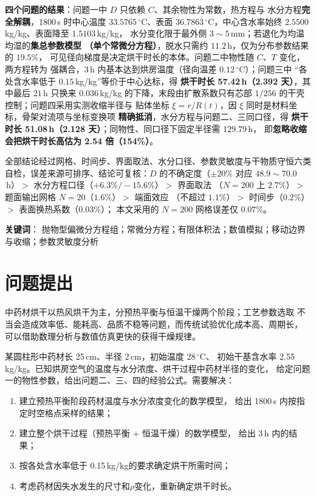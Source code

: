 \documentclass[12pt,a4paper,fontset=none]{ctexart}
\begin{document}
\textbf{四个问题的结果}：问题一中 $D$ 只依赖 $C$、其余物性为常数，热方程与
水分方程\textbf{完全解耦}，1800\,s 时中心温度 $33.5765\,^\circ$C、表面
$36.7863\,^\circ$C，中心含水率始终 $2.5500$\,kg/kg、表面降至 $1.5103$\,kg/kg，
水分变化限于最外侧 $3\sim5$\,mm；若退化为均温均湿的\textbf{集总参数模型
（单个常微分方程）}，脱水只需约 $11.2$\,h，仅为分布参数结果的 $19.5\%$，
可见径向梯度是决定烘干时长的本体。问题二中物性随 $C$、$T$ 变化，两方程转为
强耦合，3\,h 内基本达到烘房温度（径向温差 $0.12\,^\circ$C）；问题三中
“各处含水率低于 $0.15$\,kg/kg”等价于中心达标，得
\textbf{烘干时长 57.42\,h（2.392 天）}，其中最后 $21$\,h 只换来 $0.036$\,kg/kg
的下降，末段由扩散系数只有芯部 $1/256$ 的干壳控制；问题四采用实测收缩半径与
贴体坐标 $\xi=r/R(t)$，因 $\xi$ 同时是材料坐标，骨架对流项与坐标变换项
\textbf{精确抵消}，水分方程与问题二、三同口径，得
\textbf{烘干时长 51.08\,h（2.128 天）}；同物性、同口径下固定半径需 $129.79$\,h，
即\textbf{忽略收缩会把烘干时长高估为 2.54 倍（154\%）}。

全部结论经过网格、时间步、界面取法、水分口径、参数灵敏度与干物质守恒六类
自检，误差来源可排序、结论可复核：$D$ 的不确定度（$\pm20\%$ 对应
$48.9\sim70.0$\,h）$>$ 水分方程口径（$+6.3\%/-15.6\%$）$>$ 界面取法
（$N=200$ 上 $2.7\%$）$>$ 题面输出网格 $N=20$（$1.6\%$）$>$ 端面效应
（不超过 $1.1\%$）$>$ 时间步（$0.2\%$）$>$ 表面换热系数（$0.03\%$）；
本文采用的 $N=200$ 网格误差仅 $0.07\%$。

\vspace{1em}
\noindent\textbf{关键词}：
抛物型偏微分方程组；常微分方程；有限体积法；数值模拟；移动边界与收缩；参数灵敏度分析

\section{问题提出}

中药材烘干以热风烘干为主\cite{ref-pan}，分预热平衡与恒温干燥两个阶段；工艺参数选取
不当会造成效率低、能耗高、品质不稳等问题，而传统试验优化成本高、周期长，
可以借助数理分析与数值仿真更快的获得干燥规律。

某圆柱形中药材长 25\,cm、半径 2\,cm，初始温度 28\,$^\circ$C、
初始干基含水率 2.55\,kg/kg。已知烘房空气的温度与水分浓度、烘干过程中药材半径的变化，
给定问题一的物性参数，给出问题二、三、四的经验公式。需要解决：

\begin{enumerate}
  \item 建立预热平衡阶段药材温度与水分浓度变化的数学模型，
        给出 1800\,s 内按指定时空格点采样的结果；
  \item 建立整个烘干过程（预热平衡 $+$ 恒温干燥）的数学模型，
        给出 3\,h 内的结果；
  \item 按各处含水率低于 0.15\,kg/kg的要求确定烘干所需时间；
  \item 考虑药材因失水发生的尺寸和$\rho$变化，重新确定烘干时长。
\end{enumerate}
\end{document}
